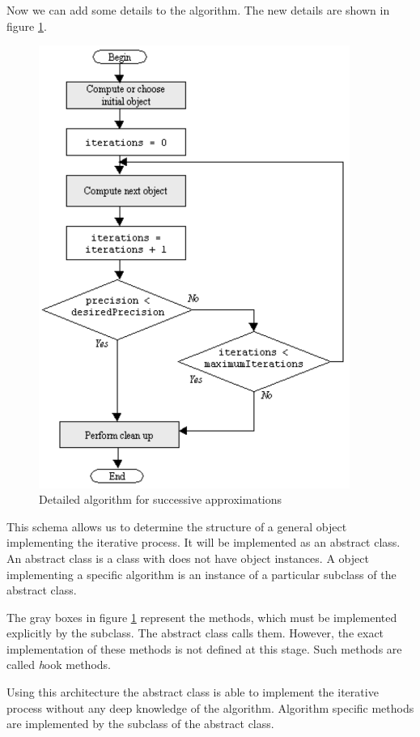 Now we can add some details to the
algorithm. The new details are shown in figure \ref{fig:iterfine}.
\begin{figure}
\centering\includegraphics[width=4in]{Figures/IterationFineFlow}
\caption{Detailed algorithm for successive
approximations}\label{fig:iterfine}
\end{figure}
This schema allows us to determine the structure of a general
object implementing the iterative process. It will be implemented
as an abstract class. An abstract class is a class with does not
have object instances. A object implementing a specific algorithm
is an instance of a particular subclass of the abstract class.

The gray boxes in figure \ref{fig:iterfine} represent the methods,
which must be implemented explicitly by the subclass. The abstract
class calls them. However, the exact implementation of these
methods is not defined at this stage.
Such methods are called {\textsl hook} methods.

Using this architecture the abstract class is able to implement
the iterative process without any deep knowledge of the algorithm.
Algorithm specific methods are implemented by the subclass of the
abstract class.

